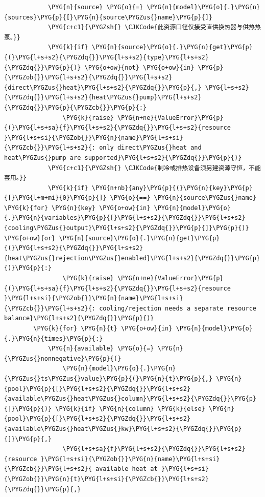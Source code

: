 \begin{Verbatim}
            \PYG{n}{source} \PYG{o}{=} \PYG{n}{model}\PYG{o}{.}\PYG{n}{sources}\PYG{p}{[}\PYG{n}{source\PYGZus{}name}\PYG{p}{]}
            \PYG{c+c1}{\PYGZsh{} \CJKCode{此资源口径仅接受直供换热器与供热热泵。}}
            \PYG{k}{if} \PYG{n}{source}\PYG{o}{.}\PYG{n}{get}\PYG{p}{(}\PYG{l+s+s2}{\PYGZdq{}}\PYG{l+s+s2}{type}\PYG{l+s+s2}{\PYGZdq{}}\PYG{p}{)} \PYG{o+ow}{not} \PYG{o+ow}{in} \PYG{p}{\PYGZob{}}\PYG{l+s+s2}{\PYGZdq{}}\PYG{l+s+s2}{direct\PYGZus{}heat}\PYG{l+s+s2}{\PYGZdq{}}\PYG{p}{,} \PYG{l+s+s2}{\PYGZdq{}}\PYG{l+s+s2}{heat\PYGZus{}pump}\PYG{l+s+s2}{\PYGZdq{}}\PYG{p}{\PYGZcb{}}\PYG{p}{:}
                \PYG{k}{raise} \PYG{n+ne}{ValueError}\PYG{p}{(}\PYG{l+s+sa}{f}\PYG{l+s+s2}{\PYGZdq{}}\PYG{l+s+s2}{resource }\PYG{l+s+si}{\PYGZob{}}\PYG{n}{name}\PYG{l+s+si}{\PYGZcb{}}\PYG{l+s+s2}{: only direct\PYGZus{}heat and heat\PYGZus{}pump are supported}\PYG{l+s+s2}{\PYGZdq{}}\PYG{p}{)}
            \PYG{c+c1}{\PYGZsh{} \CJKCode{制冷或排热设备须另建资源守恒，不能套用。}}
            \PYG{k}{if} \PYG{n+nb}{any}\PYG{p}{(}\PYG{n}{key}\PYG{p}{[}\PYG{l+m+mi}{0}\PYG{p}{]} \PYG{o}{==} \PYG{n}{source\PYGZus{}name} \PYG{k}{for} \PYG{n}{key} \PYG{o+ow}{in} \PYG{n}{model}\PYG{o}{.}\PYG{n}{variables}\PYG{p}{[}\PYG{l+s+s2}{\PYGZdq{}}\PYG{l+s+s2}{cooling\PYGZus{}output}\PYG{l+s+s2}{\PYGZdq{}}\PYG{p}{]}\PYG{p}{)} \PYG{o+ow}{or} \PYG{n}{source}\PYG{o}{.}\PYG{n}{get}\PYG{p}{(}\PYG{l+s+s2}{\PYGZdq{}}\PYG{l+s+s2}{heat\PYGZus{}rejection\PYGZus{}enabled}\PYG{l+s+s2}{\PYGZdq{}}\PYG{p}{)}\PYG{p}{:}
                \PYG{k}{raise} \PYG{n+ne}{ValueError}\PYG{p}{(}\PYG{l+s+sa}{f}\PYG{l+s+s2}{\PYGZdq{}}\PYG{l+s+s2}{resource }\PYG{l+s+si}{\PYGZob{}}\PYG{n}{name}\PYG{l+s+si}{\PYGZcb{}}\PYG{l+s+s2}{: cooling/rejection needs a separate resource balance}\PYG{l+s+s2}{\PYGZdq{}}\PYG{p}{)}
        \PYG{k}{for} \PYG{n}{t} \PYG{o+ow}{in} \PYG{n}{model}\PYG{o}{.}\PYG{n}{times}\PYG{p}{:}
            \PYG{n}{available} \PYG{o}{=} \PYG{n}{\PYGZus{}nonnegative}\PYG{p}{(}
                \PYG{n}{model}\PYG{o}{.}\PYG{n}{\PYGZus{}ts\PYGZus{}value}\PYG{p}{(}\PYG{n}{t}\PYG{p}{,} \PYG{n}{pool}\PYG{p}{[}\PYG{l+s+s2}{\PYGZdq{}}\PYG{l+s+s2}{available\PYGZus{}heat\PYGZus{}column}\PYG{l+s+s2}{\PYGZdq{}}\PYG{p}{]}\PYG{p}{)} \PYG{k}{if} \PYG{n}{column} \PYG{k}{else} \PYG{n}{pool}\PYG{p}{[}\PYG{l+s+s2}{\PYGZdq{}}\PYG{l+s+s2}{available\PYGZus{}heat\PYGZus{}kw}\PYG{l+s+s2}{\PYGZdq{}}\PYG{p}{]}\PYG{p}{,}
                \PYG{l+s+sa}{f}\PYG{l+s+s2}{\PYGZdq{}}\PYG{l+s+s2}{resource }\PYG{l+s+si}{\PYGZob{}}\PYG{n}{name}\PYG{l+s+si}{\PYGZcb{}}\PYG{l+s+s2}{ available heat at }\PYG{l+s+si}{\PYGZob{}}\PYG{n}{t}\PYG{l+s+si}{\PYGZcb{}}\PYG{l+s+s2}{\PYGZdq{}}\PYG{p}{,}

\end{Verbatim}

